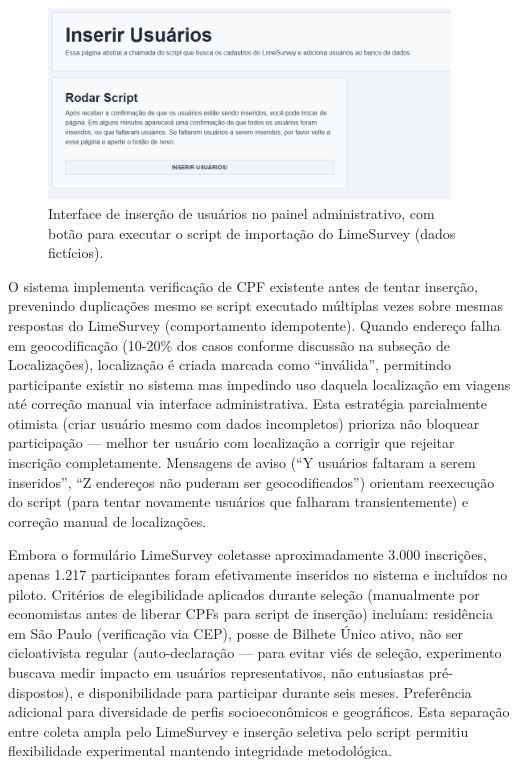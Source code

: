 \begin{figure}[H]
  \centering
  \includegraphics[width=0.95\textwidth]{figuras/inserir_usuarios.PNG}
  \caption{Interface de inserção de usuários no painel administrativo, com botão para executar o script de importação do LimeSurvey (dados fictícios).}
  \label{fig:insercao_usuarios}
\end{figure}

O sistema implementa verificação de CPF existente antes de tentar inserção, prevenindo duplicações mesmo se script executado múltiplas vezes sobre mesmas respostas do LimeSurvey (comportamento idempotente). Quando endereço falha em geocodificação (10-20\% dos casos conforme discussão na subseção de Localizações), localização é criada marcada como ``inválida'', permitindo participante existir no sistema mas impedindo uso daquela localização em viagens até correção manual via interface administrativa. Esta estratégia parcialmente otimista (criar usuário mesmo com dados incompletos) prioriza não bloquear participação --- melhor ter usuário com localização a corrigir que rejeitar inscrição completamente. Mensagens de aviso (``Y usuários faltaram a serem inseridos'', ``Z endereços não puderam ser geocodificados'') orientam reexecução do script (para tentar novamente usuários que falharam transientemente) e correção manual de localizações.

Embora o formulário LimeSurvey coletasse aproximadamente 3.000 inscrições, apenas 1.217 participantes foram efetivamente inseridos no sistema e incluídos no piloto. Critérios de elegibilidade aplicados durante seleção (manualmente por economistas antes de liberar CPFs para script de inserção) incluíam: residência em São Paulo (verificação via CEP), posse de Bilhete Único ativo, não ser cicloativista regular (auto-declaração --- para evitar viés de seleção, experimento buscava medir impacto em usuários representativos, não entusiastas pré-dispostos), e disponibilidade para participar durante seis meses. Preferência adicional para diversidade de perfis socioeconômicos e geográficos. Esta separação entre coleta ampla pelo LimeSurvey e inserção seletiva pelo script permitiu flexibilidade experimental mantendo integridade metodológica.


